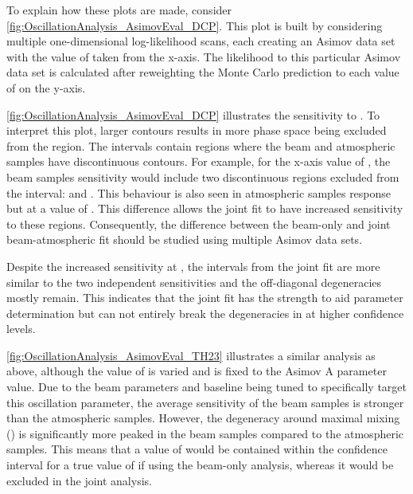 To explain how these plots are made, consider \autoref{fig:OscillationAnalysis_AsimovEval_DCP}. This plot is built by considering multiple one-dimensional log-likelihood scans, each creating an Asimov data set with the value of  taken from the x-axis. The likelihood to this particular Asimov data set is calculated after reweighting the Monte Carlo prediction to each value of  on the y-axis.

\autoref{fig:OscillationAnalysis_AsimovEval_DCP} illustrates the sensitivity to . To interpret this plot, larger contours results in more phase space being excluded from the \quickmath{1\sigma} region. The \quickmath{1\sigma} intervals contain regions where the beam and atmospheric samples have discontinuous contours. For example, for the x-axis value of , the beam samples sensitivity would include two discontinuous regions excluded from the \quickmath{1\sigma} interval:  and . This behaviour is also seen in atmospheric samples response but at a value of . This difference allows the joint fit to have increased sensitivity to these regions. Consequently, the difference between the beam-only and joint beam-atmospheric fit should be studied using multiple Asimov data sets.

Despite the increased sensitivity at \quickmath{1\sigma}, the \quickmath{2\sigma} intervals from the joint fit are more similar to the two independent sensitivities and the off-diagonal degeneracies mostly remain. This indicates that the joint fit has the strength to aid parameter determination but can not entirely break the degeneracies in  at higher confidence levels. 

\autoref{fig:OscillationAnalysis_AsimovEval_TH23} illustrates a similar analysis as above, although the value of  is varied and  is fixed to the Asimov A parameter value. Due to the beam parameters and baseline being tuned to specifically target this oscillation parameter, the average sensitivity of the beam samples is stronger than the atmospheric samples. However, the degeneracy around maximal mixing () is significantly more peaked in the beam samples compared to the atmospheric samples. This means that a value of  would be contained within the \quickmath{1\sigma} confidence interval for a true value of  if using the beam-only analysis, whereas it would be excluded in the joint analysis.

